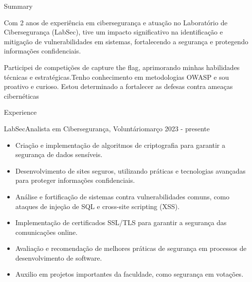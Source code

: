 \documentclass[]{mcdowellcv}
\begin{document}
\makeheader

\begin{cvsection}{Summary}
        \vspace{\baselineskip}
	\item Com 2 anos de experiência em cibersegurança e atuação no Laboratório de Cibersegurança (LabSec), tive um impacto significativo na identificação e mitigação de vulnerabilidades em sistemas, fortalecendo a segurança e protegendo informações confidenciais. 
        \item Participei de competições de capture the flag, aprimorando minhas habilidades técnicas e estratégicas.Tenho conhecimento em metodologias OWASP e sou proativo e curioso. Estou determinado a fortalecer as defesas contra ameaças cibernéticas
\end{cvsection}

\begin{cvsection}{Experience}
	\begin{cvsubsection}{LabSec}{Analista em Cibersegurança, Voluntário}{março 2023 - presente}
		\begin{itemize}
                \vspace{\baselineskip}
                \item Criação e implementação de algoritmos de criptografia para garantir a segurança de dados sensíveis.
			\item Desenvolvimento de sites seguros, utilizando práticas e tecnologias avançadas para proteger informações confidenciais.
			\item Análise e fortificação de sistemas contra vulnerabilidades comuns, como ataques de injeção de SQL e cross-site scripting (XSS).
			\item Implementação de certificados SSL/TLS para garantir a segurança das comunicações online.
			\item Avaliação e recomendação de melhores práticas de segurança em processos de desenvolvimento de software.
			\item Auxilio em projetos importantes da faculdade, como segurança em votações.
		\end{itemize}
	\end{cvsubsection}
\end{cvsection}
\end{document}
